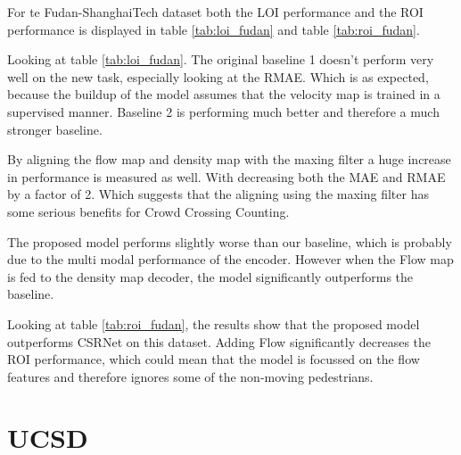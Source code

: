 For te Fudan-ShanghaiTech dataset both the LOI performance and the ROI performance is displayed in table \ref{tab:loi_fudan} and table \ref{tab:roi_fudan}.

Looking at table \ref{tab:loi_fudan}. The original baseline 1 doesn't perform very well on the new task, especially looking at the RMAE. Which is as expected, because the buildup of the model assumes that the velocity map is trained in a supervised manner. Baseline 2 is performing much better and therefore a much stronger baseline.

By aligning the flow map and density map with the maxing filter a huge increase in performance is measured as well. With decreasing both the MAE and RMAE by a factor of 2. Which suggests that the aligning using the maxing filter has some serious benefits for Crowd Crossing Counting.

The proposed model performs slightly worse than our baseline, which is probably due to the multi modal performance of the encoder. However when the Flow map is fed to the density map decoder, the model significantly outperforms the baseline.

Looking at table \ref{tab:roi_fudan}, the results show that the proposed model outperforms CSRNet \cite{li2018csrnet} on this dataset. Adding Flow significantly decreases the ROI performance, which could mean that the model is focussed on the flow features and therefore ignores some of the non-moving pedestrians.

\section{UCSD}

